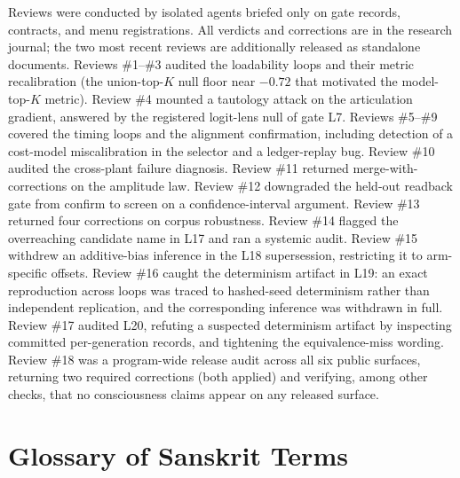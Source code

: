 Reviews were conducted by isolated agents briefed only on gate records, contracts, and menu registrations. All verdicts and corrections are in the research journal; the two most recent reviews are additionally released as standalone documents. Reviews \#1--\#3 audited the loadability loops and their metric recalibration (the union-top-$K$ null floor near $-0.72$ that motivated the model-top-$K$ metric). Review \#4 mounted a tautology attack on the articulation gradient, answered by the registered logit-lens null of gate L7. Reviews \#5--\#9 covered the timing loops and the alignment confirmation, including detection of a cost-model miscalibration in the selector and a ledger-replay bug. Review \#10 audited the cross-plant failure diagnosis. Review \#11 returned merge-with-corrections on the amplitude law. Review \#12 downgraded the held-out readback gate from confirm to screen on a confidence-interval argument. Review \#13 returned four corrections on corpus robustness. Review \#14 flagged the overreaching candidate name in L17 and ran a systemic audit. Review \#15 withdrew an additive-bias inference in the L18 supersession, restricting it to arm-specific offsets. Review \#16 caught the determinism artifact in L19: an exact reproduction across loops was traced to hashed-seed determinism rather than independent replication, and the corresponding inference was withdrawn in full. Review \#17 audited L20, refuting a suspected determinism artifact by inspecting committed per-generation records, and tightening the equivalence-miss wording. Review \#18 was a program-wide release audit across all six public surfaces, returning two required corrections (both applied) and verifying, among other checks, that no consciousness claims appear on any released surface.

\section{Glossary of Sanskrit Terms}
\label{app:glossary}

